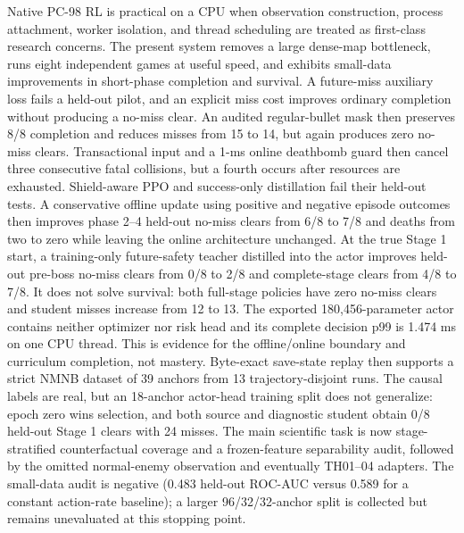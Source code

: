 \documentclass[10pt]{article}
\begin{document}
Native PC-98 RL is practical on a CPU when observation construction, process
attachment, worker isolation, and thread scheduling are treated as first-class
research concerns.  The present system removes a large dense-map bottleneck,
runs eight independent games at useful speed, and exhibits small-data
improvements in short-phase completion and survival.  A future-miss auxiliary
loss fails a held-out pilot, and an explicit miss cost improves ordinary
completion without producing a no-miss clear.  An audited regular-bullet mask
then preserves 8/8 completion and reduces misses from 15 to 14, but again
produces zero no-miss clears.  Transactional input and a 1-ms online deathbomb
guard then cancel three consecutive fatal collisions, but a fourth occurs after
resources are exhausted.  Shield-aware PPO and success-only distillation fail
their held-out tests.  A conservative offline update using positive and
negative episode outcomes then improves phase 2--4 held-out no-miss clears from
6/8 to 7/8 and deaths from two to zero while leaving the online architecture
unchanged.  At the true Stage 1 start, a training-only future-safety teacher
distilled into the actor improves held-out pre-boss no-miss clears from 0/8 to
2/8 and complete-stage clears from 4/8 to 7/8.  It does not solve survival:
both full-stage policies have zero no-miss clears and student misses increase
from 12 to 13.  The exported 180,456-parameter actor contains neither optimizer
nor risk head and its complete decision p99 is 1.474 ms on one CPU thread.
This is evidence for the offline/online boundary and curriculum completion,
not mastery.  Byte-exact save-state replay then supports a strict NMNB dataset
of 39 anchors from 13 trajectory-disjoint runs.  The causal labels are real,
but an 18-anchor actor-head training split does not generalize: epoch zero wins
selection, and both source and diagnostic student obtain 0/8 held-out Stage 1
clears with 24 misses.  The main scientific task is now stage-stratified
counterfactual coverage and a frozen-feature separability audit, followed by
the omitted normal-enemy observation and eventually TH01--04 adapters.  The
small-data audit is negative (0.483 held-out ROC-AUC versus 0.589 for a constant
action-rate baseline); a larger 96/32/32-anchor split is collected but remains
unevaluated at this stopping point.



\end{document}

